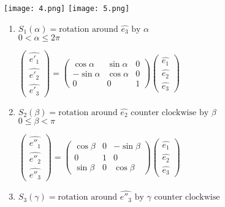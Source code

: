 \documentclass[12]{article}
\begin{document}
\begin{center}
\texttt{[image: 4.png]}
\texttt{[image: 5.png]}
\end{center}

\newpage


\begin{enumerate}

\item $S_{1}(\alpha)= \mbox{rotation around  $\hat{e_{3}}$ by $\alpha$}$\\

$0 < \alpha \le 2\pi$

$\begin{pmatrix}
\hat{e'_{1}}\\
\hat{e'_{2}}\\
\hat{e'_{3}}
\end{pmatrix}=\begin{pmatrix}
\cos \alpha & \sin \alpha & 0\\
-\sin \alpha & \cos \alpha & 0\\
0 & 0 & 1
\end{pmatrix} \begin{pmatrix}
\hat{e_{1}}\\
\hat{e_{2}}\\
\hat{e_{3}}
\end{pmatrix}
$

\item $S_{2}(\beta)= \mbox{rotation around  $\hat{e_{2}}$ counter clockwise by $\beta$}$\\

$0 \le \beta <\pi$

$\begin{pmatrix}
\hat{e''_{1}}\\
\hat{e''_{2}}\\
\hat{e''_{3}}
\end{pmatrix}
=\begin{pmatrix}
\cos \beta&0&-\sin \beta\\
0&1&0\\
\sin \beta&0&\cos \beta
\end{pmatrix}
\begin{pmatrix}
\hat{e_{1}}\\
\hat{e_{2}}\\
\hat{e_{3}}
\end{pmatrix}$\\

\item $S_{3}(\gamma)= \mbox{rotation around $\hat{e''_{3}}$ by $\gamma$ counter clockwise}$\\


\end{enumerate}
\end{document}
